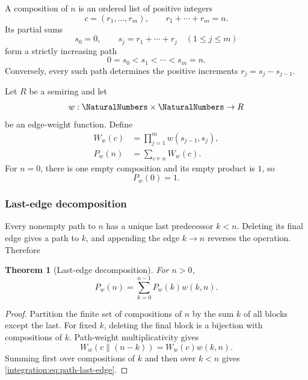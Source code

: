 \documentclass[11pt,oneside]{article}
\newtheorem{theorem}{Theorem}[section]
\theoremstyle{definition}
\theoremstyle{remark}
\begin{document}
A composition of $n$ is an ordered list of positive integers
\begin{equation}
 c=(r_1,\ldots,r_m),
 \qquad
 r_1+\cdots+r_m=n.
 \label{integration:eq:composition}
\end{equation}
Its partial sums
\begin{equation}
 s_0=0,
 \qquad
 s_j=r_1+\cdots+r_j
 \quad(1\le j\le m)
 \label{integration:eq:composition-partial-sums}
\end{equation}
form a strictly increasing path
\begin{equation}
 0=s_0<s_1<\cdots<s_m=n.
 \label{integration:eq:increasing-path}
\end{equation}
Conversely, every such path determines the positive increments $r_j=s_j-s_{j-1}$.

Let $R$ be a semiring and let
\begin{equation}
 w:\NaturalNumbers\times\NaturalNumbers\to R
 \label{integration:eq:generic-edge-weight}
\end{equation}
be an edge-weight function.  Define
\begin{align}
 W_w(c)&=\prod_{j=1}^{m}w(s_{j-1},s_j),                    \label{integration:eq:path-weight}\\
 P_w(n)&=\sum_{c\models n}W_w(c).                          \label{integration:eq:path-sum}
\end{align}
For $n=0$, there is one empty composition and its empty product is $1$, so
\begin{equation}
 P_w(0)=1.
 \label{integration:eq:path-sum-zero}
\end{equation}

\subsubsection{Last-edge decomposition}

Every nonempty path to $n$ has a unique last predecessor $k<n$.  Deleting its final edge
gives a path to $k$, and appending the edge $k\to n$ reverses the operation.  Therefore

\begin{theorem}[Last-edge decomposition]
\label{integration:thm:path-last-edge}
For $n>0$,
\begin{equation}
 P_w(n)=\sum_{k=0}^{n-1}P_w(k)w(k,n).
 \label{integration:eq:path-last-edge}
\end{equation}
\end{theorem}

\begin{proof}
Partition the finite set of compositions of $n$ by the sum $k$ of all blocks except the last.
For fixed $k$, deleting the final block is a bijection with compositions of $k$.  Path-weight
multiplicativity gives
\[
 W_w(c\mathbin{\|}(n-k))=W_w(c)w(k,n).
\]
Summing first over compositions of $k$ and then over $k<n$ gives
\eqref{integration:eq:path-last-edge}.
\end{proof}
\end{document}
